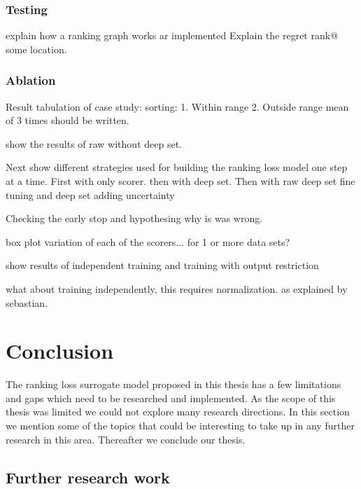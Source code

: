 \documentclass[12pt, twoside, ngerman]{report}
\begin{document}
\subsection{Testing}
explain how a ranking graph works ar implemented
Explain the regret rank@ some location.

\subsection{Ablation}

Result tabulation of case study: sorting:
1.  Within range
2.   Outside range 
mean of 3 times should be written.

show the results of raw without deep set.

Next show different strategies used for building the ranking loss model one step at a time.
First with only scorer.
then with deep set.
Then with raw deep set
fine tuning and deep set
adding uncertainty

Checking the early stop and hypothesing why is was wrong.

box plot variation of each of the scorers... for 1 or more data sets?

show results of independent training and training with output restriction

what about training independently,   this requires normalization. 
as explained by sebastian.
\fi

\chapter{Conclusion}

The ranking loss surrogate model proposed in this thesis has a few limitations and gaps which need to be researched and implemented. 
As the scope of this thesis was limited we could not explore many research directions.
In this section we mention some of the topics that could be interesting to take up in any further research in this area.
Thereafter we conclude our thesis.

\section{Further research work}
\end{document}
